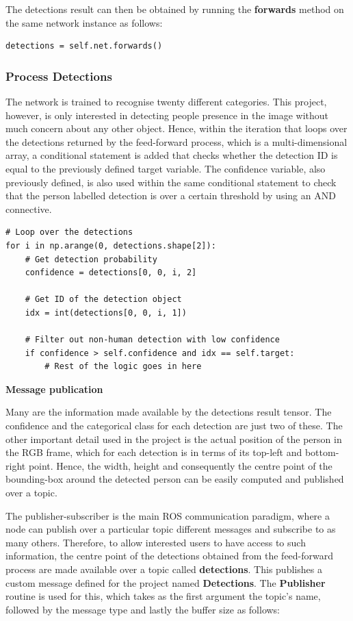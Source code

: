 The detections result can then be obtained by running the \textbf{forwards} method on the same network instance as follows:

\begin{lstlisting}
detections = self.net.forwards()
\end{lstlisting}

\subsubsection{Process Detections}

The network is trained to recognise twenty different categories. This project, however, is only interested in detecting people presence in the image without much concern about any other object. Hence, within the iteration that loops over the detections returned by the feed-forward process, which is a multi-dimensional array, a conditional statement is added that checks whether the detection ID is equal to the previously defined target variable. The confidence variable, also previously defined, is also used within the same conditional statement to check that the person labelled detection is over a certain threshold by using an AND connective.

\begin{lstlisting}
# Loop over the detections
for i in np.arange(0, detections.shape[2]):
	# Get detection probability
	confidence = detections[0, 0, i, 2]

	# Get ID of the detection object
	idx = int(detections[0, 0, i, 1])

	# Filter out non-human detection with low confidence
	if confidence > self.confidence and idx == self.target:
    	# Rest of the logic goes in here
\end{lstlisting}

\textbf{Message publication}

Many are the information made available by the detections result tensor. The confidence and the categorical class for each detection are just two of these. The other important detail used in the project is the actual position of the person in the RGB frame, which for each detection is in terms of its top-left and bottom-right point. Hence, the width, height and consequently the centre point of the bounding-box around the detected person can be easily computed and published over a topic.

The publisher-subscriber is the main ROS communication paradigm, where a node can publish over a particular topic different messages and subscribe to as many others. Therefore, to allow interested users to have access to such information, the centre point of the detections obtained from the feed-forward process are made available over a topic called \textbf{detections}. This publishes a custom message defined for the project named \textbf{Detections}. The \textbf{Publisher} routine is used for this, which takes as the first argument the topic's name, followed by the message type and lastly the buffer size as follows:


